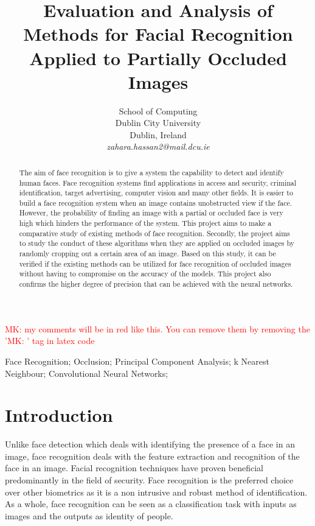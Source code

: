\documentclass[conference]{IEEEtran}
\newcommand{\MK}[1]{\textcolor{red}{MK: #1}}  %
\begin{document}
\title{Evaluation and Analysis of Methods for Facial Recognition Applied to Partially Occluded Images}

\author{
School of Computing\\
Dublin City University\\
Dublin, Ireland \\
\textit{zahara.hassan2@mail.dcu.ie
}}

\maketitle

\MK{my comments will be in red like this. You can remove them by removing the '\MK' tag in latex code}

\begin{abstract}
The aim of face recognition is to give a system the capability to detect and identify human faces. Face recognition systems find applications in access and security, criminal identification, target advertising, computer vision and many other fields. It is easier to build a face recognition system when an image contains unobstructed view if the face. However, the probability of finding an image with a partial or occluded face is very high which hinders the performance of the system. This project aims to make a comparative study of existing methods of face recognition. Secondly, the project aims to study the conduct of these algorithms when they are applied on occluded images by randomly cropping out a certain area of an image. Based on this study, it can be verified if the existing methods can be utilized for face recognition of occluded images without having to compromise on the accuracy of the models. This project also confirms the higher degree of precision that can be achieved with the neural networks.

\end{abstract}

\begin{IEEEkeywords}
Face Recognition; Occlusion; Principal Component Analysis; k Nearest Neighbour; Convolutional Neural Networks;

\end{IEEEkeywords}

\section{Introduction}
\label{sec: 1.introduction}
Unlike face detection which deals with identifying the presence of a face in an image, face recognition deals with the feature extraction and recognition of the face in an image. Facial recognition techniques have proven beneficial predominantly in the field of security. Face recognition is the preferred choice over other biometrics as it is a non intrusive and robust method of identification. As a whole, face recognition can be seen as a classification task with inputs as images and the outputs as identity of people. 
\end{document}
